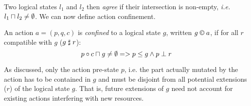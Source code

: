 Two logical states $l_1$ and $l_2$ then \emph{agree} if their intersection is non-empty, \textit{i.e.} $l_1 \sqcap_{} l_2 \not= \emptyset$. We can now define action confinement.
%
%
\begin{definition}\label{def:actconf}
An action $a = (p, q, c)$ is \emph{confined} to a logical state $g$, written $g\containI a$, if for all $r$ compatible with $g$ ($g \mathrel{\sharp} r$):
%
\[
	p \circ c \sqcap_{} g \neq\emptyset => p \leq g \land p \mathrel{\bot} r
\]
\end{definition}
%
As discussed, only the action pre-state $p$, i.e. the part actually mutated by the action has to be contained in $g$ and must be disjoint from all potential extensions ($r$) of the logical state $g$. That is, future extensions of $g$ need not account for existing actions interfering with new resources.\\


